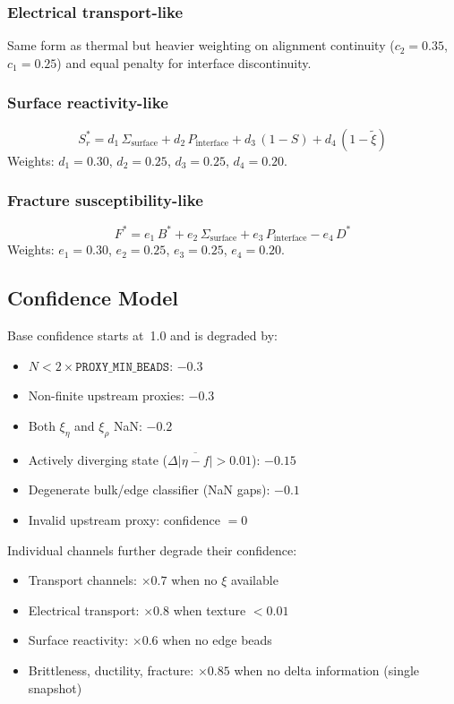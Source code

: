 \documentclass[11pt]{article}
\begin{document}
\subsubsection{Electrical transport-like}
Same form as thermal but heavier weighting on alignment continuity
($c_2{=}0.35$, $c_1{=}0.25$) and equal penalty for interface
discontinuity.

\subsubsection{Surface reactivity-like}
\begin{equation}
  S_r^* = d_1\,\Sigma_\text{surface} + d_2\,P_\text{interface}
        + d_3\,(1 - S) + d_4\,(1 - \tilde\xi)
\end{equation}
Weights: $d_1{=}0.30$, $d_2{=}0.25$, $d_3{=}0.25$, $d_4{=}0.20$.

\subsubsection{Fracture susceptibility-like}
\begin{equation}
  F^* = e_1\,B^* + e_2\,\Sigma_\text{surface}
      + e_3\,P_\text{interface} - e_4\,D^*
\end{equation}
Weights: $e_1{=}0.30$, $e_2{=}0.25$, $e_3{=}0.25$, $e_4{=}0.20$.

\subsection{Confidence Model}

Base confidence starts at~1.0 and is degraded by:
\begin{itemize}
  \item $N < 2 \times \texttt{PROXY\_MIN\_BEADS}$: $-0.3$
  \item Non-finite upstream proxies: $-0.3$
  \item Both $\xi_\eta$ and $\xi_\rho$ NaN: $-0.2$
  \item Actively diverging state ($\Delta\overline{|\eta-f|} > 0.01$): $-0.15$
  \item Degenerate bulk/edge classifier (NaN gaps): $-0.1$
  \item Invalid upstream proxy: confidence $= 0$
\end{itemize}

Individual channels further degrade their confidence:
\begin{itemize}
  \item Transport channels: $\times 0.7$ when no $\xi$ available
  \item Electrical transport: $\times 0.8$ when texture $< 0.01$
  \item Surface reactivity: $\times 0.6$ when no edge beads
  \item Brittleness, ductility, fracture: $\times 0.85$ when no
        delta information (single snapshot)
\end{itemize}
\end{document}
